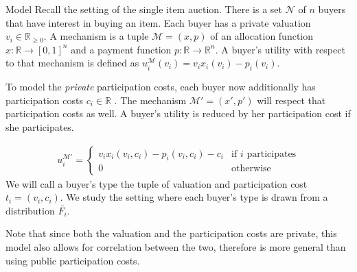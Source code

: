 \documentclass[11pt,a4paper]{article}
\newcommand{\RR}{\ensuremath{\mathbb{R}}}
\newcommand{\1}[1]{\mbox{\rm\bf 1}_{#1}}
\begin{document}
\begin{section}{Model}
 \label{sec:model}
 Recall the setting of the single item auction.
 There is a set $\mathcal{N}$ of $n$ buyers that have interest in buying an item.
 Each buyer has a private valuation $v_i \in \RR_{\geq 0}$.
 A mechanism is a tuple $\mathcal{M} = (x,p)$ of an allocation function $x: \RR \rightarrow [0,1]^n$ and a payment function $p: \RR \rightarrow \RR^n$.
 A buyer's utility with respect to that mechanism is defined as $u_i^\mathcal{M}(v_i) = v_i x_i(v_i) - p_i(v_i)$.

 To model the \textit{private} participation costs, each buyer now additionally has participation costs $c_i \in \RR$ \cite{primary}.
 The mechanism $\mathcal{M}' = (x', p')$ will respect that participation costs as well.
 A buyer's utility is reduced by her participation cost if she participates.

 \begin{align*}
     u_i^{\mathcal{M}'} = \begin{cases}
                              v_i x_i(v_i, c_i) - p_i(v_i, c_i) - c_i & \text{if $i$ participates} \\
                              0                                       & \text{otherwise}
                          \end{cases}
 \end{align*}
 We will call a buyer's type the tuple of valuation and participation cost $t_i = (v_i, c_i)$.
 We study the setting where each buyer's type is drawn from a distribution $\bar{F_i}$.

 Note that since both the valuation and the participation costs are private, this model also allows for correlation between the two, therefore is more general than using public participation costs.
\end{section}
\end{document}
